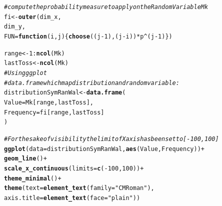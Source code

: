 \documentclass{article}\usepackage[]{graphicx}\usepackage[]{color}
\makeatletter
\newcommand{\hlnum}[1]{\textcolor[rgb]{0.686,0.059,0.569}{#1}}%
\newcommand{\hlstr}[1]{\textcolor[rgb]{0.192,0.494,0.8}{#1}}%
\newcommand{\hlcom}[1]{\textcolor[rgb]{0.678,0.584,0.686}{\textit{#1}}}%
\newcommand{\hlopt}[1]{\textcolor[rgb]{0,0,0}{#1}}%
\newcommand{\hlstd}[1]{\textcolor[rgb]{0.345,0.345,0.345}{#1}}%
\newcommand{\hlkwa}[1]{\textcolor[rgb]{0.161,0.373,0.58}{\textbf{#1}}}%
\newcommand{\hlkwb}[1]{\textcolor[rgb]{0.69,0.353,0.396}{#1}}%
\newcommand{\hlkwc}[1]{\textcolor[rgb]{0.333,0.667,0.333}{#1}}%
\newcommand{\hlkwd}[1]{\textcolor[rgb]{0.737,0.353,0.396}{\textbf{#1}}}%
\newenvironment{kframe}{%
 \def\at@end@of@kframe{}%
 \ifinner\ifhmode%
  \def\at@end@of@kframe{\end{minipage}}%
  \begin{minipage}{\columnwidth}%
 \fi\fi%
 \def\FrameCommand##1{\hskip\@totalleftmargin \hskip-\fboxsep
 \colorbox{shadecolor}{##1}\hskip-\fboxsep
     \hskip-\linewidth \hskip-\@totalleftmargin \hskip\columnwidth}%
 \MakeFramed {\advance\hsize-\width
   \@totalleftmargin\z@ \linewidth\hsize
   \@setminipage}}%
 {\par\unskip\endMakeFramed%
 \at@end@of@kframe}
\newenvironment{knitrout}{}{} %
\makeatother
\begin{document}
\begin{knitrout}
\color{fgcolor}\begin{kframe}
\begin{alltt}
\hlcom{# compute the probability measure to apply on the Random Variable Mk}
\hlstd{fi} \hlkwb{<-} \hlkwd{outer}\hlstd{(dim_x,}
            \hlstd{dim_y,}
            \hlkwc{FUN} \hlstd{=} \hlkwa{function}\hlstd{(}\hlkwc{i}\hlstd{,} \hlkwc{j}\hlstd{)\{}\hlkwd{choose}\hlstd{((j}\hlopt{-}\hlnum{1}\hlstd{), (j}\hlopt{-}\hlstd{i))} \hlopt{*} \hlstd{p}\hlopt{^}\hlstd{(j}\hlopt{-}\hlnum{1}\hlstd{)\})}
\end{alltt}
\end{kframe}
\end{knitrout}

\begin{knitrout}
\color{fgcolor}\begin{kframe}
\begin{alltt}
 \hlstd{range} \hlkwb{<-} \hlnum{1}\hlopt{:}\hlkwd{ncol}\hlstd{(Mk)}
\hlstd{lastToss} \hlkwb{<-} \hlkwd{ncol}\hlstd{(Mk)}
 \hlcom{# Using ggplot}
\hlcom{# data.frame which map distribution and random variable:}
\hlstd{distributionSymRanWal} \hlkwb{<-} \hlkwd{data.frame}\hlstd{(}
  \hlkwc{Value} \hlstd{= Mk[range, lastToss],}
  \hlkwc{Frequency} \hlstd{= fi[range, lastToss]}
\hlstd{)}

\hlcom{# For the sake of visibility the limit of X axis has been set to [-100, 100]}
\hlkwd{ggplot}\hlstd{(}\hlkwc{data} \hlstd{= distributionSymRanWal,} \hlkwd{aes}\hlstd{(Value, Frequency))} \hlopt{+}
  \hlkwd{geom_line}\hlstd{()} \hlopt{+}
  \hlkwd{scale_x_continuous}\hlstd{(}\hlkwc{limits} \hlstd{=} \hlkwd{c}\hlstd{(}\hlopt{-}\hlnum{100}\hlstd{,} \hlnum{100}\hlstd{))} \hlopt{+}
   \hlkwd{theme_minimal}\hlstd{()} \hlopt{+}
  \hlkwd{theme}\hlstd{(}\hlkwc{text} \hlstd{=} \hlkwd{element_text}\hlstd{(}\hlkwc{family}\hlstd{=}\hlstr{"CM Roman"}\hlstd{),}
        \hlkwc{axis.title} \hlstd{=} \hlkwd{element_text}\hlstd{(}\hlkwc{face} \hlstd{=} \hlstr{"plain"}\hlstd{))}
\end{alltt}



\end{kframe}
\end{knitrout}
\end{document}
